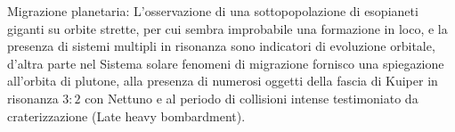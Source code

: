 \begin{wordonframe}{Migrazione planetaria:}
L'osservazione di una sottopopolazione di esopianeti giganti su orbite strette, per cui sembra improbabile una formazione in loco, e la presenza di sistemi multipli in risonanza sono indicatori di evoluzione orbitale, d'altra parte nel Sistema solare fenomeni di migrazione fornisco una spiegazione all'orbita di plutone, alla presenza di numerosi oggetti della fascia di Kuiper in risonanza $3:2$ con Nettuno e al periodo di collisioni intense testimoniato da craterizzazione (Late heavy bombardment).

\end{wordonframe}